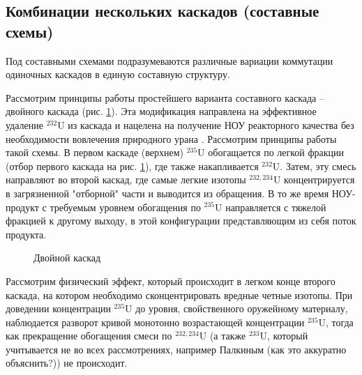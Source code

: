 \subsection{Комбинации нескольких каскадов (составные схемы)}\label{sec:ch1/sec2.3}
Под составными схемами подразумеваются различные вариации коммутации одиночных каскадов в единую составную структуру.

Рассмотрим принципы работы простейшего варианта составного каскада -- двойного каскада (рис. \ref{fig:double_ru}). Эта модификация направлена на эффективное удаление $^{232}$U из каскада и нацелена на получение НОУ реакторного качества без необходимости вовлечения природного урана \cite{SosninYuChelcov, TehnicheskieResheniyaPo, SposobIzotopnogoVosstanovleniya}.
Рассмотрим принципы работы такой схемы.
В первом каскаде (верхнем) $^{235}$U обогащается по легкой фракции (отбор первого каскада на рис. \ref{fig:double_ru}), где также накапливается $^{232}$U.
Затем, эту смесь направляют во второй каскад, где самые легкие изотопы $^{232,234}$U концентрируется в загрязненной "отборной" части и выводится из обращения.
В то же время НОУ-продукт с требуемым уровнем обогащения по $^{235}$U направляется с тяжелой фракцией к другому выходу, в этой конфигурации представляющим из себя поток продукта.
\begin{figure}[ht]
  \caption{Двойной каскад}\label{fig:double_ru}
\end{figure}

Рассмотрим физический эффект, который происходит в легком конце второго каскада, на котором необходимо сконцентрировать вредные четные изотопы.
При доведении концентрации $^{235}$U до уровня, свойственного оружейному материалу, наблюдается разворот кривой монотонно возрастающей концентрации $^{235}$U, тогда как прекращение обогащения смеси по $^{232,234}$U (а также $^{233}$U, который учитывается не во всех рассмотрениях, например Палкиным (как это аккуратно объяснить?)) не происходит.


